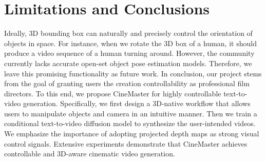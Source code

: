 
\section{Limitations and Conclusions}
Ideally, 3D bounding box can naturally and precisely control the orientation of objects in space. For instance, when we rotate the 3D box of a human, it should produce a video sequence of a human turning around. However, the community currently lacks accurate open-set object pose estimation models. Therefore, we leave this promising functionality as future work. In conclusion, our project stems from the goal of granting users the creation controllability as professional film directors. To this end, we propose CineMaster for highly controllable text-to-video generation. Specifically, we first design a 3D-native workflow that allows users to manipulate objects and camera in an intuitive manner. Then we train a conditional text-to-video diffusion model to synthesize the user-intended videos. We emphasize the importance of adopting projected depth maps as strong visual control signals. Extensive experiments demonstrate that CineMaster achieves controllable and 3D-aware cinematic video generation.

